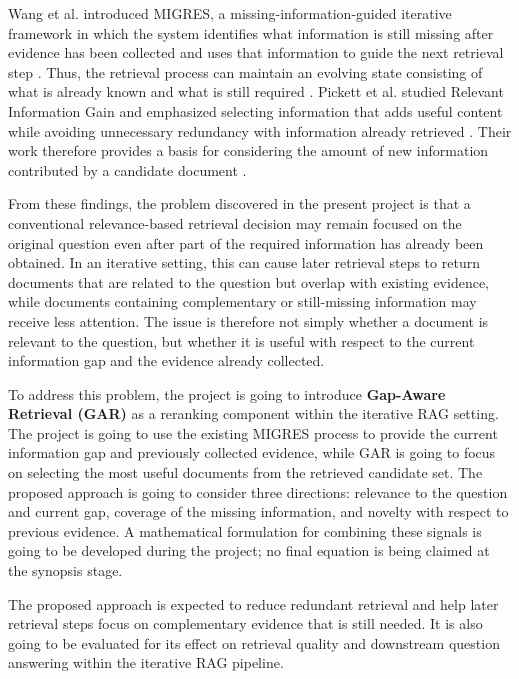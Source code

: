 \documentclass[12pt,a4paper]{report}
\begin{document}
Wang et al. introduced MIGRES, a missing-information-guided iterative
framework in which the system identifies what information is still missing
after evidence has been collected and uses that information to guide the
next retrieval step \cite{wang2025migres}. Thus, the retrieval process can
maintain an evolving state consisting of what is already known and what is
still required \cite{wang2025migres}. Pickett et al. studied Relevant
Information Gain and emphasized selecting information that adds useful
content while avoiding unnecessary redundancy with information already
retrieved \cite{pickett2024better}. Their work therefore provides a basis
for considering the amount of new information contributed by a candidate
document \cite{pickett2024better}.

From these findings, the problem discovered in the present project is that
a conventional relevance-based retrieval decision may remain focused on
the original question even after part of the required information has
already been obtained. In an iterative setting, this can cause later
retrieval steps to return documents that are related to the question but
overlap with existing evidence, while documents containing complementary
or still-missing information may receive less attention. The issue is
therefore not simply whether a document is relevant to the question, but
whether it is useful with respect to the current information gap and the
evidence already collected.

To address this problem, the project is going to introduce
\textbf{Gap-Aware Retrieval (GAR)} as a reranking component within the
iterative RAG setting. The project is going to use the existing MIGRES
process to provide the current information gap and previously collected
evidence, while GAR is going to focus on selecting the most useful
documents from the retrieved candidate set. The proposed approach is
going to consider three directions: relevance to the question and current
gap, coverage of the missing information, and novelty with respect to
previous evidence. A mathematical formulation for combining these
signals is going to be developed during the project; no final equation is
being claimed at the synopsis stage.

The proposed approach is expected to reduce redundant retrieval and help
later retrieval steps focus on complementary evidence that is still needed.
It is also going to be evaluated for its effect on retrieval quality and
downstream question answering within the iterative RAG pipeline.
\clearpage
\end{document}
